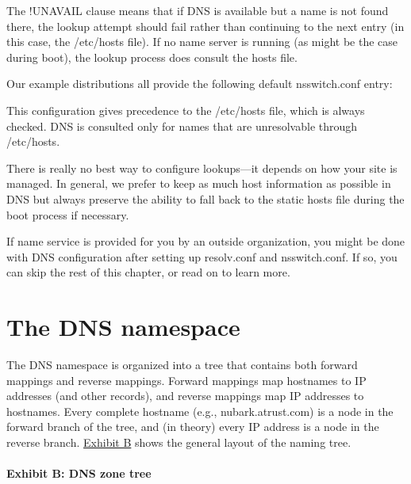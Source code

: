 The {!UNAVAIL} clause means that if DNS is available but a name is not
found there, the lookup attempt should fail rather than continuing to
the next entry (in this case, the {/etc/hosts} file). If no name server
is running (as might be the case during boot), the lookup process does
consult the {hosts} file.

Our example distributions all provide the following default
{nsswitch.conf} entry:


This configuration gives precedence to the {/etc/hosts} file, which is
always checked. DNS is consulted only for names that are unresolvable
through {/etc/hosts}.

There is really no best way to configure lookups---it depends on how
your site is managed. In general, we prefer to keep as much host
information as possible in DNS but always preserve the ability to fall
back to the static {hosts} file during the boot process if necessary.

If name service is provided for you by an outside organization, you
might be done with DNS configuration after setting up {resolv.conf} and
{nsswitch.conf}. If so, you can skip the rest of this chapter, or read
on to learn more.




\section{The DNS namespace}

\protect\hypertarget{part0024_split_007.htmlux5cux23_idIndexMarker1984}{}{}The
DNS namespace is organized into a tree that contains both
\protect\hypertarget{part0024_split_007.htmlux5cux23_idIndexMarker1985}{}{}forward
mappings and
\protect\hypertarget{part0024_split_007.htmlux5cux23_idIndexMarker1986}{}{}reverse
mappings. Forward mappings map hostnames to IP addresses (and other
records), and reverse mappings map IP addresses to hostnames. Every
complete hostname (e.g., nubark.atrust.com) is a node in the forward
branch of the tree, and (in theory) every IP address is a node in the
reverse branch.
\protect\hyperlink{part0024_split_007.htmlux5cux23_idTextAnchor850}{Exhibit
B} shows the general layout of the naming tree.

\paragraph[{Exhibit B: }DNS zone tree]{\texorpdfstring{{Exhibit B:
}\protect\hypertarget{part0024_split_007.htmlux5cux23_idTextAnchor850}{}{}DNS
zone tree}{Exhibit B: DNS zone tree}}

